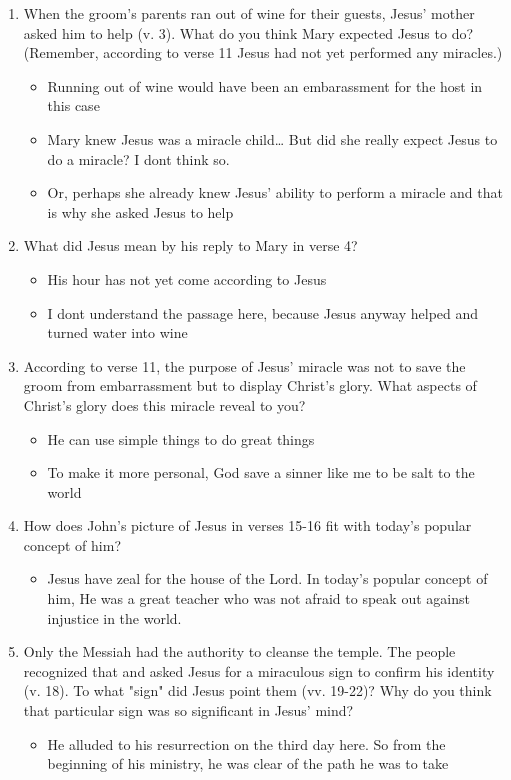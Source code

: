 \documentclass[11pt]{article}
\begin{document}
\begin{enumerate}
\item When the groom's parents ran out of wine for their guests, Jesus' mother
 asked him to help (v. 3). What do you think Mary expected Jesus to do?
(Remember, according to verse 11 Jesus had not yet performed any miracles.)
\begin{itemize}
\item Running out of wine would have been an embarassment for the host in this
case
\item Mary knew Jesus was a miracle child\ldots{} But did she really expect Jesus to
do a miracle? I dont think so.
\item Or, perhaps she already knew Jesus' ability to perform a miracle and that
is why she asked Jesus to help
\end{itemize}

\item What did Jesus mean by his reply to Mary in verse 4?
\begin{itemize}
\item His hour has not yet come according to Jesus

\item I dont understand the passage here, because Jesus anyway helped and turned
water into wine
\end{itemize}

\item According to verse 11, the purpose of Jesus' miracle was not to save the groom
from embarrassment but to display Christ's glory. What aspects of Christ's
glory does this miracle reveal to you?
\begin{itemize}
\item He can use simple things to do great things

\item To make it more personal, God save a sinner like me to be salt to the world
\end{itemize}

\item How does John's picture of Jesus in verses 15-16 fit with today's popular
concept of him?
\begin{itemize}
\item Jesus have zeal for the house of the Lord. In today's popular concept of
him, He was a great teacher who was not afraid to speak out against injustice
in the world.
\end{itemize}

\item Only the Messiah had the authority to cleanse the temple. The people
recognized that and asked Jesus for a miraculous sign to confirm his identity
(v. 18). To what "sign" did Jesus point them (vv. 19-22)? Why do you think
that particular sign was so significant in Jesus' mind?
\begin{itemize}
\item He alluded to his resurrection on the third day here. So from the beginning
of his ministry, he was clear of the path he was to take
\end{itemize}
\end{enumerate}
\end{document}

